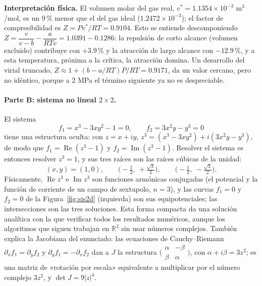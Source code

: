 \documentclass[11pt,a4paper]{article}
\begin{document}
\textbf{Interpretación física.} El volumen molar del gas real, $v^*=1.1354\times10^{-3}$ m$^3$/mol, es un 9\,\% menor que el del gas ideal ($1.2472\times10^{-3}$); el factor de compresibilidad es $Z=Pv^*/RT=0.9104$. Esto se entiende descomponiendo $Z=\dfrac v{v-b}-\dfrac a{RTv}=1.0391-0.1286$: la repulsión de corto alcance (volumen excluido) contribuye con $+3.9\,\%$ y la atracción de largo alcance con $-12.9\,\%$, y a esta temperatura, próxima a la crítica, la atracción domina. Un desarrollo del virial truncado, $Z\approx1+(b-a/RT)P/RT=0.9171$, da un valor cercano, pero no idéntico, porque a $2$ MPa el término siguiente ya no es despreciable.

\paragraph{Parte B: sistema no lineal $2\times2$.}
El sistema
\begin{equation}
f_1=x^3-3xy^2-1=0,\qquad f_2=3x^2y-y^3=0 \label{eq:sis2d}
\end{equation}
tiene una estructura oculta: con $z=x+iy$, $z^3=(x^3-3xy^2)+i(3x^2y-y^3)$, de modo que $f_1=\operatorname{Re}(z^3-1)$ y $f_2=\operatorname{Im}(z^3-1)$. Resolver el sistema es entonces resolver $z^3=1$, y sus tres raíces son las raíces cúbicas de la unidad:
\[
(x,y)=(1,0),\qquad\Big(-\tfrac12,\ +\tfrac{\sqrt3}2\Big),\qquad\Big(-\tfrac12,\ -\tfrac{\sqrt3}2\Big).
\]
Físicamente, $\operatorname{Re}z^3$ e $\operatorname{Im}z^3$ son funciones armónicas conjugadas (el potencial y la función de corriente de un campo de sextupolo, $n=3$), y las curvas $f_1=0$ y $f_2=0$ de la Figura~\ref{fig:sis2d} (izquierda) son sus equipotenciales; las intersecciones son las tres soluciones. Esta forma compacta da una solución analítica con la que verificar todos los resultados numéricos, aunque los algoritmos que siguen trabajan en $\mathbb R^2$ sin usar números complejos. También explica la Jacobiana del enunciado: las ecuaciones de Cauchy--Riemann $\partial_xf_1=\partial_yf_2$ y $\partial_yf_1=-\partial_xf_2$ dan a $J$ la estructura $\bigl(\begin{smallmatrix}\alpha&-\beta\\\beta&\alpha\end{smallmatrix}\bigr)$, con $\alpha+i\beta=3z^2$; es una matriz de «rotación por escala» equivalente a multiplicar por el número complejo $3z^2$, y $\det J=9|z|^4$.
\end{document}
